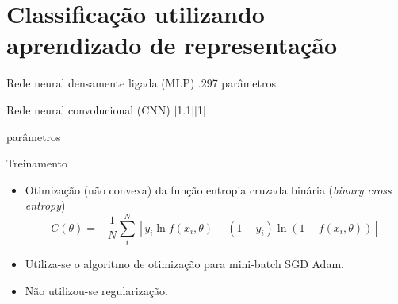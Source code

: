 \section{Classificação utilizando aprendizado de representação}

\begin{frame}{Rede neural densamente ligada (MLP)}
	\vspace{-30pt}
	.297 parâmetros
\end{frame}

\begin{frame}{Rede neural convolucional (CNN)}
	[1.1][1]

	\vspace{-30pt}
	 parâmetros
\end{frame}


\begin{frame}{Treinamento}
	\begin{itemize}
	\item Otimização (não convexa) da função entropia cruzada binária (\textit{binary cross entropy})
	\begin{equation*}
	C(\theta) = -\frac{1}{N} \sum_i^N \left[y_i \ln f(x_i,\theta) + (1-y_i) \ln (1-f(x_i,\theta))\right]
	\end{equation*}

	\item Utiliza-se o algoritmo de otimização para mini-batch SGD Adam.	
	\item Não utilizou-se regularização.
	\end{itemize}
\end{frame}
